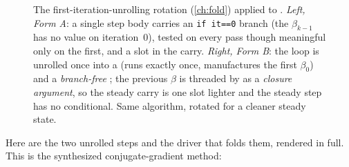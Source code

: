 \begin{figure}[t]
\caption[The Form A \texorpdfstring{$\to$}{->} Form B rotation]{The
first-iteration-unrolling rotation (\cref{ch:fold}) applied to .
\emph{Left, Form A}: a single step body carries an \lstinline[style=l4style]|if it==0|
branch (the $\beta_{k-1}$ has no value on iteration~0), tested on every pass though
meaningful only on the first, and a  slot in the carry. \emph{Right,
Form B}: the loop is unrolled once into a  (runs exactly once,
manufactures the first $\beta_0$) and a \emph{branch-free} ;
the previous $\beta$ is threaded by  as a
\emph{closure argument}, so the steady carry is one slot lighter and the steady step
has no conditional. Same algorithm, rotated for a cleaner steady state.}
\label{fig:formAB}
\end{figure}

Here are the two unrolled steps and the driver that folds them, rendered in full.
This is the synthesized conjugate-gradient method:

